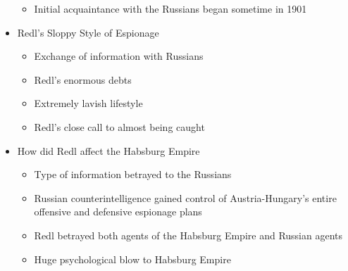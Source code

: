 \begin{itemize}
\begin{itemize}
      \item Initial acquaintance with the Russians began sometime in 1901

    \end{itemize}

  \item Redl's Sloppy Style of Espionage

    \begin{itemize}

      \item Exchange of information with Russians

      \item Redl's enormous debts

      \item Extremely lavish lifestyle

      \item Redl's close call to almost being caught

    \end{itemize}

  \item How did Redl affect the Habsburg Empire

    \begin{itemize}

      \item Type of information betrayed to the Russians

      \item Russian counterintelligence gained control of Austria-Hungary's entire offensive and defensive espionage plans

      \item Redl betrayed both agents of the Habsburg Empire and Russian agents

      \item Huge psychological blow to Habsburg Empire

    \end{itemize}

\end{itemize}




